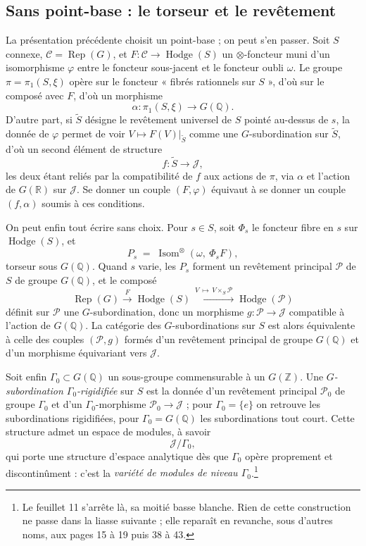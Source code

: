 \documentclass[11pt,a4paper]{article}
\begin{document}
\subsection*{Sans point-base : le torseur et le revêtement}

La présentation précédente choisit un point-base ; on peut s'en passer.
Soit $S$ connexe, $\mathcal{C} = \operatorname{Rep}(G)$, et
$F : \mathcal{C} \to \operatorname{Hodge}(S)$ un $\otimes$-foncteur muni d'un
isomorphisme $\varphi$ entre le foncteur sous-jacent et le foncteur oubli
$\omega$. Le groupe $\pi = \pi_{1}(S, \xi)$ opère sur le foncteur « fibrés
rationnels sur $S$ », d'où sur le composé avec $F$, d'où un morphisme
\[
\alpha : \pi_{1}(S, \xi) \longrightarrow G(\mathbb{Q}) .
\]
D'autre part, si $\widetilde{S}$ désigne le revêtement universel de $S$ pointé
au-dessus de $s$, la donnée de $\varphi$ permet de voir $V \mapsto
F(V)|_{\widetilde{S}}$ comme une $G$-subordination sur $\widetilde{S}$, d'où un
second élément de structure
\[
f : \widetilde{S} \longrightarrow \mathcal{J} ,
\]
les deux étant reliés par la compatibilité de $f$ aux actions de $\pi$, via
$\alpha$ et l'action de $G(\mathbb{R})$ sur $\mathcal{J}$. Se donner un couple
$(F, \varphi)$ équivaut à se donner un couple $(f, \alpha)$ soumis à ces
conditions.

On peut enfin tout écrire sans choix. Pour $s \in S$, soit $\Phi_{s}$ le foncteur
fibre en $s$ sur $\operatorname{Hodge}(S)$, et
\[
P_{s} \;=\; \operatorname{Isom}^{\otimes}(\omega,\ \Phi_{s} F) ,
\]
torseur sous $G(\mathbb{Q})$. Quand $s$ varie, les $P_{s}$ forment un revêtement
principal $\mathcal{P}$ de $S$ de groupe $G(\mathbb{Q})$, et le composé
\[
\operatorname{Rep}(G) \xrightarrow{\ F\ } \operatorname{Hodge}(S)
\xrightarrow{\ V\, \mapsto\, V \times_{S} \mathcal{P}\ } \operatorname{Hodge}(\mathcal{P})
\]
définit sur $\mathcal{P}$ une $G$-subordination, donc un morphisme
$g : \mathcal{P} \to \mathcal{J}$ compatible à l'action de $G(\mathbb{Q})$.
La catégorie des $G$-subordinations sur $S$ est alors équivalente à celle des
couples $(\mathcal{P}, g)$ formés d'un revêtement principal de groupe
$G(\mathbb{Q})$ et d'un morphisme équivariant vers $\mathcal{J}$.

Soit enfin $\Gamma_{0} \subset G(\mathbb{Q})$ un sous-groupe commensurable à un
$G(\mathbb{Z})$. Une \emph{$G$-subordination $\Gamma_{0}$-rigidifiée} sur $S$
est la donnée d'un revêtement principal $\mathcal{P}_{0}$ de groupe
$\Gamma_{0}$ et d'un $\Gamma_{0}$-morphisme $\mathcal{P}_{0} \to \mathcal{J}$ ;
pour $\Gamma_{0} = \{e\}$ on retrouve les subordinations rigidifiées, pour
$\Gamma_{0} = G(\mathbb{Q})$ les subordinations tout court. Cette structure
admet un espace de modules, à savoir
\[
\mathcal{J} / \Gamma_{0} ,
\]
qui porte une structure d'espace analytique dès que $\Gamma_{0}$ opère
proprement et discontinûment : c'est la \emph{variété de modules de niveau
$\Gamma_{0}$}.\footnote{Le feuillet 11 s'arrête là, sa moitié basse blanche.
Rien de cette construction ne passe dans la liasse suivante ; elle reparaît en
revanche, sous d'autres noms, aux pages 15 à 19 puis 38 à 43.}
\end{document}
